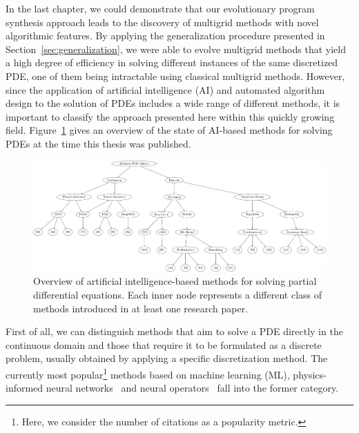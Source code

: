 In the last chapter, we could demonstrate that our evolutionary program synthesis approach leads to the discovery of multigrid methods with novel algorithmic features.
By applying the generalization procedure presented in  Section~\ref{sec:generalization}, we were able to evolve multigrid methods that yield a high degree of efficiency in solving different instances of the same discretized PDE, one of them being intractable using classical multigrid methods.
However, since the application of artificial intelligence (AI) and automated algorithm design to the solution of PDEs includes a wide range of different methods, it is important to classify the approach presented here within this quickly growing field.
Figure~\ref{fig:overview-ai-based-methods} gives an overview of the state of AI-based methods for solving PDEs at the time this thesis was published.
\begin{figure}
	\includegraphics[width=\textwidth]{figures/trees/related_work.pdf}
	\caption[Overview of artificial intelligence-based methods for solving partial differential equations]{Overview of artificial intelligence-based methods for solving partial differential equations. Each inner node represents a different class of methods introduced in at least one research paper.}
	\label{fig:overview-ai-based-methods}
\end{figure}
First of all, we can distinguish methods that aim to solve a PDE directly in the continuous domain and those that require it to be formulated as a discrete problem, usually obtained by applying a specific discretization method.
The currently most popular\footnote{Here, we consider the number of citations as a popularity metric.} methods based on machine learning (ML), physics-informed neural networks~\cite{karniadakis2021physics,raissi2019physics,kharazmi2019variational,kharazmi2021hp} and neural operators~\cite{li2020fourier,guibas2021efficient,lu2021learning,li2021physics} fall into the former category.
